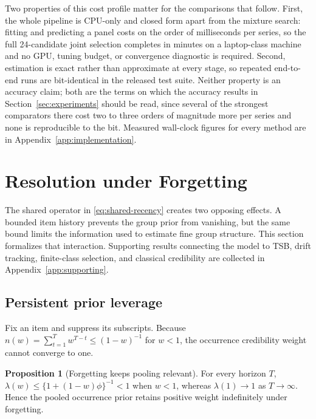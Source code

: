 \documentclass[twoside]{article}
\theoremstyle{definition}
\newtheorem{proposition}{Proposition}
\begin{document}
Two properties of this cost profile matter for the comparisons that
follow. First, the whole pipeline is CPU-only and closed form apart from
the mixture search: fitting and predicting a panel costs on the order of
milliseconds per series, so the full 24-candidate joint selection
completes in minutes on a laptop-class machine and no GPU, tuning budget,
or convergence diagnostic is required. Second, estimation is exact rather
than approximate at every stage, so repeated end-to-end runs are
bit-identical in the released test suite. Neither property is an accuracy
claim; both are the terms on which the accuracy results in
Section~\ref{sec:experiments} should be read, since several of the
strongest comparators there cost two to three orders of magnitude more per
series and none is reproducible to the bit. Measured wall-clock figures
for every method are in Appendix~\ref{app:implementation}.

\section{Resolution under Forgetting}\label{sec:theory}

The shared operator in \eqref{eq:shared-recency} creates two opposing
effects. A bounded item history prevents the group prior from vanishing,
but the same bound limits the information used to estimate fine group
structure. This section formalizes that interaction. Supporting results
connecting the model to TSB, drift tracking, finite-class selection, and
classical credibility are collected in Appendix~\ref{app:supporting}.

\subsection{Persistent prior leverage}

Fix an item and suppress its subscripts. Because
$n(w)=\sum_{t=1}^{T}w^{T-t}\le(1-w)^{-1}$ for $w<1$, the occurrence
credibility weight cannot converge to one.

\begin{proposition}[Forgetting keeps pooling relevant]
\label{prop:active}
For every horizon $T$,
$\lambda(w)\le\{1+(1-w)\phi\}^{-1}<1$ when $w<1$, whereas
$\lambda(1)\to1$ as $T\to\infty$. Hence the pooled occurrence prior
retains positive weight indefinitely under forgetting.
\end{proposition}
\end{document}
